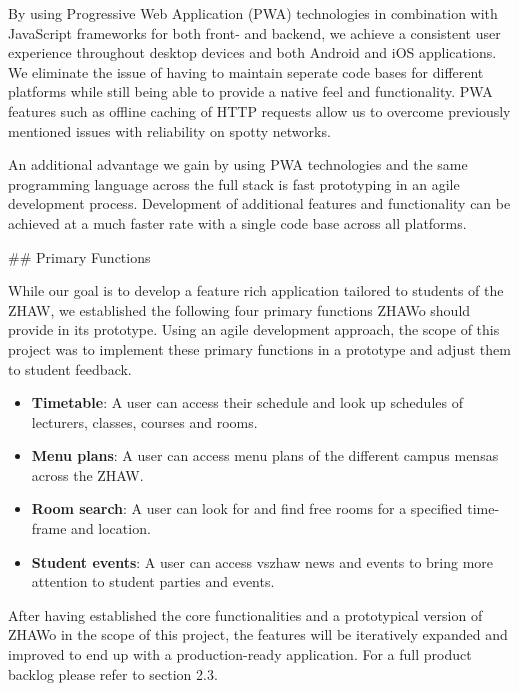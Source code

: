 \begin{markdown}
By using Progressive Web Application (PWA) technologies \cite{DUMMY} in combination with JavaScript frameworks for both front- and backend, we achieve a consistent user experience throughout desktop devices and both Android and iOS applications. We eliminate the issue of having to maintain seperate code bases for different platforms while still being able to provide a native feel and functionality. PWA features such as offline caching of HTTP requests allow us to overcome previously mentioned issues with reliability on spotty networks.

An additional advantage we gain by using PWA technologies and the same programming language across the full stack is fast prototyping in an agile development process. Development of additional features and functionality can be achieved at a much faster rate with a single code base across all platforms.

\newpage

## Primary Functions

While our goal is to develop a feature rich application tailored to students of the ZHAW, we established the following four primary functions ZHAWo should provide in its prototype. Using an agile development approach, the scope of this project was to implement these primary functions in a prototype and adjust them to student feedback.

\begin{itemize}
  \item \textbf{Timetable}: A user can access their schedule and look up schedules of lecturers, classes, courses and rooms.
  \item \textbf{Menu plans}: A user can access menu plans of the different campus mensas across the ZHAW.
  \item \textbf{Room search}: A user can look for and find free rooms for a specified time-frame and location.
  \item \textbf{Student events}: A user can access vszhaw news and events to bring more attention to student parties and events.
\end{itemize}

After having established the core functionalities and a prototypical version of ZHAWo in the scope of this project, the features will be iteratively expanded and improved to end up with a production-ready application. For a full product backlog please refer to section 2.3.

\end{markdown}
